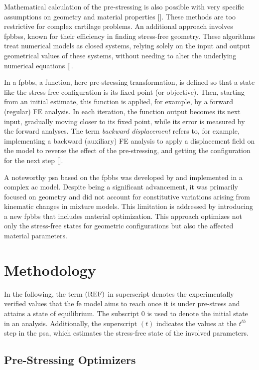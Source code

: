 Mathematical calculation of the pre-stressing is also possible with very specific assumptions on geometry and material properties [\cite{alastru2007,rachev2003,taber1996}]. These methods are too restrictive for complex cartilage problems. An additional approach involves \acp{fpbbs}, known for their efficiency in finding stress-free geometry. These algorithms treat numerical models as closed systems, relying solely on the input and output geometrical values of these systems, without needing to alter the underlying numerical equations [\cite{leach2019}].

In a \ac{fpbbs}, a function, here pre-stressing transformation, is defined so that a state like the stress-free configuration is its fixed point (or objective). Then, starting from an initial estimate, this function is applied, for example, by a forward (regular) FE analysis. In each iteration, the function output becomes its next input, gradually moving closer to its fixed point, while its error is measured by the forward analyses. The term \textit{backward displacement} refers to, for example, implementing a backward (auxiliary) FE analysis to apply a displacement field on the model to reverse the effect of the pre-stressing, and getting the configuration for the next step [\cite{leach2019}].

A noteworthy \ac{psa} based on the \ac{fpbbs} was developed by \cite{wang2018} and implemented in a complex \ac{ac} model. Despite being a significant advancement, it was primarily focused on geometry and did not account for constitutive variations arising from kinematic changes in mixture models. This limitation is addressed by introducing a new \ac{fpbbs} that includes material optimization. This approach optimizes not only the stress-free states for geometric configurations but also the affected material parameters.

\section{Methodology}
In the following, the term $\rm{(REF)}$ in superscript denotes the experimentally verified values that the \ac{fe} model aims to reach once it is under pre-stress and attains a state of equilibrium. The subscript $0$ is used to denote the initial state in an analysis. Additionally, the superscript $(t)$ indicates the values at the $t^{th}$ step in the \ac{psa}, which estimates the stress-free state of the involved parameters.

\subsection{Pre-Stressing Optimizers}

